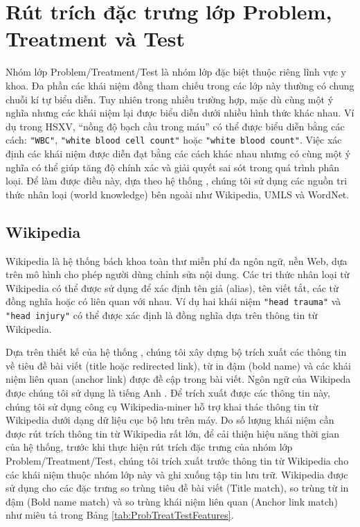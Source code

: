 \section{Rút trích đặc trưng lớp Problem, Treatment và Test}
Nhóm lớp Problem/Treatment/Test là nhóm lớp đặc biệt thuộc riêng lĩnh vực y khoa. Đa phần các khái niệm đồng tham chiếu trong các lớp này thường có chung chuỗi kí tự biểu diễn. Tuy nhiên trong nhiều trường hợp, mặc dù cùng một ý nghĩa nhưng các khái niệm lại được biểu diễn dưới nhiều hình thức khác nhau. Ví dụ trong HSXV, ``nồng độ bạch cầu trong máu'' có thể được biểu diễn bằng các cách: \texttt{"WBC"}, \texttt{"white blood cell count"} hoặc \texttt{"white blood count"}. Việc xác định các khái niệm được diễn đạt bằng các cách khác nhau nhưng có cùng một ý nghĩa có thể giúp tăng độ chính xác và giải quyết sai sót trong quá trình phân loại. Để làm được điều này, dựa theo hệ thống \cite{YanXu2012}, chúng tôi sử dụng các nguồn tri thức nhân loại (world knowledge) bên ngoài như Wikipedia, UMLS và WordNet.

\subsection*{Wikipedia}
Wikipedia là hệ thống bách khoa toàn thư miễn phí đa ngôn ngữ, nền Web, dựa trên mô hình cho phép người dùng chỉnh sửa nội dung. Các tri thức nhân loại từ Wikipedia có thể được sử dụng để xác định tên giả (alias), tên viết tắt, các từ đồng nghĩa hoặc có liên quan với nhau. Ví dụ hai khái niệm \texttt{"head trauma"} và \texttt{"head injury"} có thể được xác định là đồng nghĩa dựa trên thông tin từ Wikipedia.

Dựa trên thiết kế của hệ thống \cite{YanXu2012}, chúng tôi xây dựng bộ trích xuất các thông tin về tiêu đề bài viết (title hoặc redirected link), từ in đậm (bold name) và các khái niệm liên quan (anchor link) được đề cập trong bài viết. Ngôn ngữ của Wikipeda được chúng tôi sử dụng là tiếng Anh . Để trích xuất được các thông tin này, chúng tôi sử dụng công cụ Wikipedia-miner hỗ trợ khai thác thông tin từ Wikipedia dưới dạng dữ liệu cục bộ lưu trên máy. Do số lượng khái niệm cần được rút trích thông tin từ Wikipedia rất lớn, để cải thiện hiệu năng thời gian của hệ thống, trước khi thực hiện rút trích đặc trưng của nhóm lớp Problem/Treatment/Test, chúng tôi trích xuất trước thông tin từ Wikipedia cho các khái niệm thuộc nhóm lớp này và ghi xuống tập tin lưu trữ. Wikipedia được sử dụng cho các đặc trưng so trùng tiêu đề bài viết (Title match), so trùng từ in đậm (Bold name match) và so trùng khái niệm liên quan (Anchor link match) như miêu tả trong Bảng \ref{tab:ProbTreatTestFeatures}.

